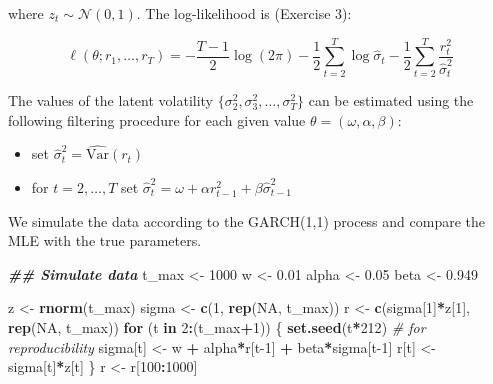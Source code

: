 \documentclass[
]{book}
\newenvironment{Shaded}{\begin{snugshade}}{\end{snugshade}}
\newcommand{\CommentTok}[1]{\textcolor[rgb]{0.56,0.35,0.01}{\textit{#1}}}
\newcommand{\ConstantTok}[1]{\textcolor[rgb]{0.56,0.35,0.01}{#1}}
\newcommand{\ControlFlowTok}[1]{\textcolor[rgb]{0.13,0.29,0.53}{\textbf{#1}}}
\newcommand{\DecValTok}[1]{\textcolor[rgb]{0.00,0.00,0.81}{#1}}
\newcommand{\DocumentationTok}[1]{\textcolor[rgb]{0.56,0.35,0.01}{\textbf{\textit{#1}}}}
\newcommand{\FloatTok}[1]{\textcolor[rgb]{0.00,0.00,0.81}{#1}}
\newcommand{\FunctionTok}[1]{\textcolor[rgb]{0.13,0.29,0.53}{\textbf{#1}}}
\newcommand{\NormalTok}[1]{#1}
\newcommand{\OtherTok}[1]{\textcolor[rgb]{0.56,0.35,0.01}{#1}}
\newcommand{\SpecialCharTok}[1]{\textcolor[rgb]{0.81,0.36,0.00}{\textbf{#1}}}
\providecommand{\tightlist}{%
  \setlength{\itemsep}{0pt}\setlength{\parskip}{0pt}}
\begin{document}
where \(z_t \sim \mathcal{N}(0, 1)\). The log-likelihood is (Exercise 3):

\[
\ell(\theta; r_1, \dots, r_T) = -\frac{T-1}{2}\log(2\pi) - \frac{1}{2}\sum_{t=2}^T\log\hat\sigma_t -\frac{1}{2} \sum_{t=2}^T \frac{r_t^2}{\hat\sigma^2_t}
\]

The values of the latent volatility \(\{\sigma_2^2, \sigma_3^2, \dots, \sigma_T^2\}\) can be estimated using the following filtering procedure for each given value \(\theta = (\omega, \alpha, \beta)\):

\begin{itemize}
\tightlist
\item
  set \(\hat\sigma^2_t = \hat{\text{Var}}(r_t)\)
\item
  for \(t = 2, \dots, T\) set \(\hat\sigma^2_t = \omega + \alpha r_{t-1}^2 + \beta \hat\sigma^2_{t-1}\)
\end{itemize}

We simulate the data according to the GARCH(1,1) process and compare the MLE with the true parameters.

\begin{Shaded}
\begin{Highlighting}[]
\DocumentationTok{\#\# Simulate data}
\NormalTok{t\_max }\OtherTok{\textless{}{-}} \DecValTok{1000}
\NormalTok{w }\OtherTok{\textless{}{-}} \FloatTok{0.01}
\NormalTok{alpha }\OtherTok{\textless{}{-}} \FloatTok{0.05}
\NormalTok{beta }\OtherTok{\textless{}{-}} \FloatTok{0.949}

\NormalTok{z }\OtherTok{\textless{}{-}} \FunctionTok{rnorm}\NormalTok{(t\_max)}
\NormalTok{sigma }\OtherTok{\textless{}{-}} \FunctionTok{c}\NormalTok{(}\DecValTok{1}\NormalTok{, }\FunctionTok{rep}\NormalTok{(}\ConstantTok{NA}\NormalTok{, t\_max))}
\NormalTok{r     }\OtherTok{\textless{}{-}} \FunctionTok{c}\NormalTok{(sigma[}\DecValTok{1}\NormalTok{]}\SpecialCharTok{*}\NormalTok{z[}\DecValTok{1}\NormalTok{], }\FunctionTok{rep}\NormalTok{(}\ConstantTok{NA}\NormalTok{, t\_max))}
\ControlFlowTok{for}\NormalTok{ (t }\ControlFlowTok{in} \DecValTok{2}\SpecialCharTok{:}\NormalTok{(t\_max}\SpecialCharTok{+}\DecValTok{1}\NormalTok{)) \{}
  \FunctionTok{set.seed}\NormalTok{(t}\SpecialCharTok{*}\DecValTok{212}\NormalTok{) }\CommentTok{\# for reproducibility}
\NormalTok{  sigma[t] }\OtherTok{\textless{}{-}}\NormalTok{ w }\SpecialCharTok{+}\NormalTok{ alpha}\SpecialCharTok{*}\NormalTok{r[t}\DecValTok{{-}1}\NormalTok{] }\SpecialCharTok{+}\NormalTok{ beta}\SpecialCharTok{*}\NormalTok{sigma[t}\DecValTok{{-}1}\NormalTok{]}
\NormalTok{  r[t]     }\OtherTok{\textless{}{-}}\NormalTok{ sigma[t]}\SpecialCharTok{*}\NormalTok{z[t]}
\NormalTok{\}}
\NormalTok{r }\OtherTok{\textless{}{-}}\NormalTok{ r[}\DecValTok{100}\SpecialCharTok{:}\DecValTok{1000}\NormalTok{]}
\end{Highlighting}
\end{Shaded}
\end{document}
